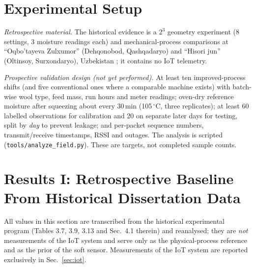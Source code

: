 \documentclass[journal]{IEEEtran}
\begin{document}
\section{Experimental Setup}
\emph{Retrospective material.} The historical evidence is a $2^3$ geometry experiment (8 settings, 3 moisture
readings each) and mechanical-process comparisons at ``Oqbo'tayeva Zulxumor'' (Dehqonobod, Qashqadaryo) and
``Hisori jun'' (Oltinsoy, Surxondaryo), Uzbekistan \cite{tuguzbayeva2024}; it contains no IoT telemetry.

\emph{Prospective validation design (not yet performed).} At least ten improved-process shifts (and five
conventional ones where a comparable machine exists) with batch-wise wool type, feed mass, run hours and meter
readings; oven-dry reference moisture after squeezing about every 30\,min (105\,$^\circ$C, three replicates); at least
60 labelled observations for calibration and 20 on separate later days for testing, split by \emph{day} to prevent
leakage; and per-packet sequence numbers, transmit/receive timestamps, RSSI and outages. The analysis is scripted
(\texttt{tools/analyze\_field.py}). These are targets, not completed sample counts.

\section{Results I: Retrospective Baseline From Historical Dissertation Data}
\label{sec:baseline}
All values in this section are transcribed from the historical experimental program \cite{tuguzbayeva2024}
(Tables 3.7, 3.9, 3.13 and Sec.~4.1 therein) and reanalysed; they are \emph{not} measurements of the IoT system and
serve only as the physical-process reference and as the prior of the soft sensor. Measurements of the IoT system are
reported exclusively in Sec.~\ref{sec:iot}.
\end{document}
